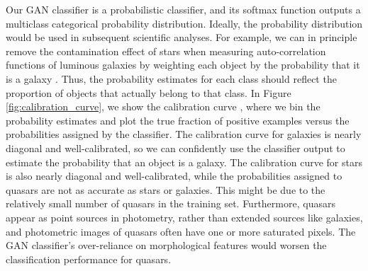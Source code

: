 Our GAN classifier is a probabilistic classifier, and its softmax function outputs a multiclass categorical
probability distribution.
Ideally, the probability distribution would be used in subsequent scientific analyses.
For example, we can in principle remove the contamination effect of stars when measuring auto-correlation functions of
luminous galaxies by weighting each object by the probability that it is a galaxy \citep{ross2011ameliorating}.
Thus, the probability estimates for each class should reflect the proportion of objects that actually belong to that class.
In Figure \ref{fig:calibration_curve}, we show the calibration curve \citep[or reliability curves;][]{degroot1983comparison},
where we bin the probability estimates and plot the true fraction of positive examples versus the probabilities assigned
by the classifier.
The calibration curve for galaxies is nearly diagonal and well-calibrated, so we can confidently use the
classifier output to estimate the probability that an object is a galaxy.
The calibration curve for stars is also nearly diagonal and well-calibrated,
while the probabilities assigned to quasars are not as accurate as stars or galaxies.
This might be due to the relatively small number of quasars in the training set.
Furthermore, quasars appear as point sources in photometry, rather than extended sources like galaxies,
and photometric images of quasars often have one or more saturated pixels.
The GAN classifier's over-reliance on morphological features would worsen the classification performance for quasars.

